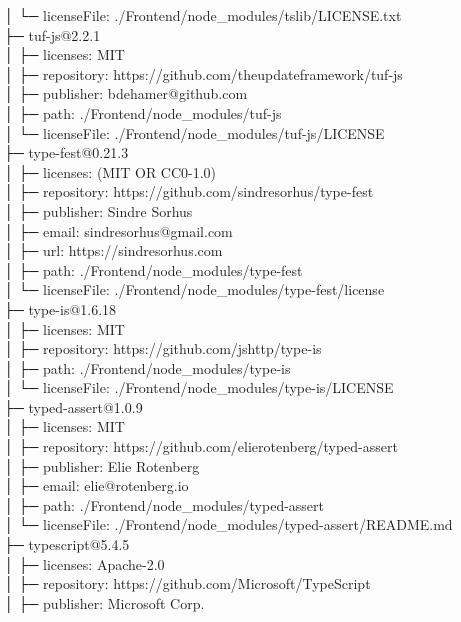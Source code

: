 \documentclass[
    paper=a4,
    twoside=false,
    parskip=half,
    listof=entryprefix,
    listof=totoc,
    index=totoc,
    bibliography=totoc,
    headsepline,
]{scrbook}
\begin{document}
    │  └─ licenseFile: ./Frontend/node\_modules/tslib/LICENSE.txt\\
    ├─ tuf-js@2.2.1\\
    │  ├─ licenses: MIT\\
    │  ├─ repository: https://github.com/theupdateframework/tuf-js\\
    │  ├─ publisher: bdehamer@github.com\\
    │  ├─ path: ./Frontend/node\_modules/tuf-js\\
    │  └─ licenseFile: ./Frontend/node\_modules/tuf-js/LICENSE\\
    ├─ type-fest@0.21.3\\
    │  ├─ licenses: (MIT OR CC0-1.0)\\
    │  ├─ repository: https://github.com/sindresorhus/type-fest\\
    │  ├─ publisher: Sindre Sorhus\\
    │  ├─ email: sindresorhus@gmail.com\\
    │  ├─ url: https://sindresorhus.com\\
    │  ├─ path: ./Frontend/node\_modules/type-fest\\
    │  └─ licenseFile: ./Frontend/node\_modules/type-fest/license\\
    ├─ type-is@1.6.18\\
    │  ├─ licenses: MIT\\
    │  ├─ repository: https://github.com/jshttp/type-is\\
    │  ├─ path: ./Frontend/node\_modules/type-is\\
    │  └─ licenseFile: ./Frontend/node\_modules/type-is/LICENSE\\
    ├─ typed-assert@1.0.9\\
    │  ├─ licenses: MIT\\
    │  ├─ repository: https://github.com/elierotenberg/typed-assert\\
    │  ├─ publisher: Elie Rotenberg\\
    │  ├─ email: elie@rotenberg.io\\
    │  ├─ path: ./Frontend/node\_modules/typed-assert\\
    │  └─ licenseFile: ./Frontend/node\_modules/typed-assert/README.md\\
    ├─ typescript@5.4.5\\
    │  ├─ licenses: Apache-2.0\\
    │  ├─ repository: https://github.com/Microsoft/TypeScript\\
    │  ├─ publisher: Microsoft Corp.\\
\end{document}
